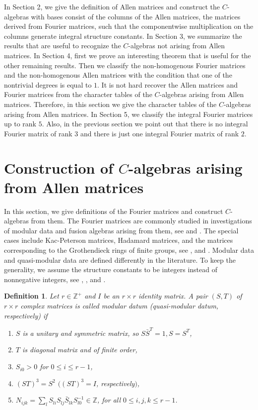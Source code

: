 \documentclass[12pt]{amsart}
\newtheorem{definition}[thm]{Definition}
\begin{document}
\medskip

In Section 2, we give the definition of  Allen matrices and construct the $C$-algebras with  bases consist of the columns of the Allen matrices, the matrices derived from Fourier matrices, such that  the componentwise multiplication on the columns generate integral structure constants. In Section 3, we summarize the results that are useful to recognize the $C$-algebras not arising from Allen matrices. In Section 4, first we prove an interesting theorem that is useful for the other  remaining results. Then we classify the non-homogenous Fourier matrices and the non-homogenous Allen matrices with the condition that one of the nontrivial degrees is equal to $1$. It is not hard recover the Allen matrices and Fourier matrices from the character tables of the $C$-algebras arising from Allen matrices. Therefore, in this section we give the character tables of the $C$-algebras arising from Allen matrices. In Section 5, we classify the integral Fourier matrices up to rank $5$. Also, in the previous section we point out that there is no integral Fourier matrix of rank $3$ and there is just one integral Fourier matrix of rank $2$.

\section{Construction of $C$-algebras arising from Allen matrices}

In this section, we give definitions of the Fourier matrices and construct $C$-algebras from them. The Fourier matrices are commonly studied in investigations of modular data and fusion algebras arising from them, see \cite{MC} and  \cite{MC1}. The special cases include Kac-Peterson matrices, Hadamard matrices, and the matrices  corresponding to the Grothendieck rings of finite groups, see \cite{MC}, \cite{MC1} and \cite{TG}. Modular data and quasi-modular data are defined differently in the literature. To keep the generality, we assume the structure constants to be integers instead of nonnegative integers, see \cite{BI}, \cite{MC}, \cite{MC1} and \cite{TG}.

\begin{definition}\label{ModularDef} Let $r\in {{\mathbb Z}}^+$ and  $I$ be an $r \times r$ identity matrix. A pair $(S,T)$ of $r\times r$ complex matrices is called modular datum  (quasi-modular datum, respectively) if
\begin{enumerate}
\item $S$ is a unitary and symmetric matrix, so $S\bar{S}^T = 1, S= S^T$,
\item  $T$ is diagonal matrix and of finite order,
\item $S_{i0}>0$ for $0\leq i\leq r-1$,
\item $(ST)^3=S^2$ $\big($$(ST)^3=I$, respectively$\big)$,
\item $N_{ijk}= \sum_l{S_{li}S_{lj}\bar S_{lk}}{S^{-1}_{l0}} \in {{\mathbb Z}}$, for all $0\leq i,j,k\leq r-1$.
\end{enumerate}
 \end{definition}
\end{document}
